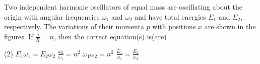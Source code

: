 

    \item Two independent harmonic oscillators of equal mass are oscillating about the origin with angular frequencies \( \omega_1 \) and \( \omega_2 \) and have total energies \( E_1 \) and \( E_2 \), respectively. The variations of their momenta \( p \) with positions \( x \) are shown in the figures. If \( \frac{a}{R} = n \), then the correct equation(s) is(are)
    \begin{center}
        \end{center}
        \begin{tasks}(2)
            \task \( E_1\omega_1 = E_2\omega_2 \)
            \task \( \frac{\omega_2}{\omega_1} = n^2 \)
            \task \( \omega_1\omega_2 = n^2 \)
            \task \( \frac{E_1}{\omega_1} = \frac{E_2}{\omega_2} \)
        \end{tasks}



